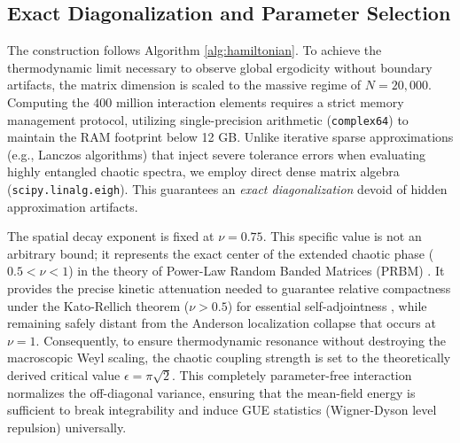 \documentclass[aps,prl,preprint,superscriptaddress,floatfix]{revtex4-2}
\begin{document}
\subsection{Exact Diagonalization and Parameter Selection}
The construction follows Algorithm \ref{alg:hamiltonian}. To achieve the thermodynamic limit necessary to observe global ergodicity without boundary artifacts, the matrix dimension is scaled to the massive regime of $N=20,000$. Computing the $400$ million interaction elements requires a strict memory management protocol, utilizing single-precision arithmetic (\texttt{complex64}) to maintain the RAM footprint below 12 GB.
Unlike iterative sparse approximations (e.g., Lanczos algorithms) that inject severe tolerance errors when evaluating highly entangled chaotic spectra, we employ direct dense matrix algebra (\texttt{scipy.linalg.eigh}). This guarantees an \textit{exact diagonalization} devoid of hidden approximation artifacts.

The spatial decay exponent is fixed at $\nu = 0.75$. This specific value is not an arbitrary bound; it represents the exact center of the extended chaotic phase ($0.5 < \nu < 1$) in the theory of Power-Law Random Banded Matrices (PRBM) \cite{Mirlin1996}. It provides the precise kinetic attenuation needed to guarantee relative compactness under the Kato-Rellich theorem ($\nu > 0.5$) for essential self-adjointness \cite{ReedSimon1975}, while remaining safely distant from the Anderson localization collapse that occurs at $\nu = 1$. Consequently, to ensure thermodynamic resonance without destroying the macroscopic Weyl scaling, the chaotic coupling strength is set to the theoretically derived critical value $\epsilon = \pi \sqrt{2}$. This completely parameter-free interaction normalizes the off-diagonal variance, ensuring that the mean-field energy is sufficient to break integrability and induce GUE statistics (Wigner-Dyson level repulsion) universally.
\end{document}
